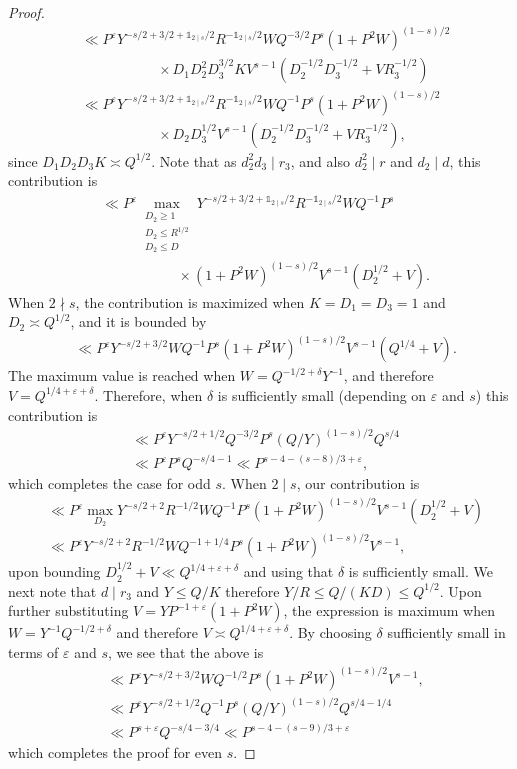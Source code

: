 \documentclass[letterpaper,11pt]{amsart}
\numberwithin{equation}{section}
\theoremstyle{definition}
\numberwithin{equation}{section}
\newcommand{\ve}{\varepsilon}
\begin{document}
\begin{proof}
\begin{align*}
&\ll P^{\ve}Y^{-s/2+3/2+\mathds{1}_{2\mid s}/2}R^{-\mathds{1}_{2\mid s}/2}WQ^{-3/2}P^{s}(1+P^2W)^{(1-s)/2}\\ & \quad \quad \quad \quad \quad \ \ \times D_1D_2^{2}D_3^{3/2}KV^{s-1}(D_2^{-1/2}D_3^{-1/2}+VR_3^{-1/2})\\
&\ll P^{\ve} Y^{-s/2+3/2+\mathds{1}_{2\mid s}/2}R^{-\mathds{1}_{2\mid s}/2}WQ^{-1}P^{s}(1+P^2W)^{(1-s)/2}\\ & \quad \quad \quad \quad \quad \ \ \times D_2D_3^{1/2}V^{s-1}(D_2^{-1/2}D_3^{-1/2}+VR_3^{-1/2}),
\end{align*}
since $D_1D_2D_3K\asymp Q^{1/2}$.
Note that as $d_2^2d_3\mid r_3$, and also $d_2^2\mid r$ and $d_2\mid d$, this contribution is
\begin{align*}
&\ll P^{\ve} \max_{ \substack{D_2 \geq 1\\ D_2\leq R^{1/2}\\D_2 \leq D}}Y^{-s/2+3/2+\mathds{1}_{2\mid s}/2}R^{-\mathds{1}_{2\mid s}/2}WQ^{-1}P^{s}\\ & \quad \quad \quad \quad \quad \ \ \times (1+P^2W)^{(1-s)/2}V^{s-1}(D_2^{1/2}+V).
\end{align*}
When $2\nmid s$, the contribution is maximized when $K=D_1=D_3=1$ and $D_2\asymp Q^{1/2}$, and it is bounded by
\begin{align*}
&\ll P^{\ve}Y^{-s/2+3/2}WQ^{-1}P^{s}(1+P^2W)^{(1-s)/2}V^{s-1}(Q^{1/4}+V).
\end{align*}
The maximum value is reached when $W=Q^{-1/2+\delta}Y^{-1} $, and therefore $V=Q^{1/4+\ve+\delta}$. Therefore, when $\delta$ is sufficiently small (depending on $\ve$ and $s$) this contribution is
\begin{align*}
&\ll P^{\ve}Y^{-s/2+1/2}Q^{-3/2}P^{s}(Q/Y)^{(1-s)/2}Q^{s/4}
\\&\ll P^{\ve}P^{s}Q^{-s/4-1}\ll P^{s-4-(s-8)/3+\ve},
\end{align*}
which completes the case for odd $s$. When $2\mid s $, our contribution is
\begin{align*}
    &\ll P^{\ve} \max_{ D_2}Y^{-s/2+2}R^{-1/2}WQ^{-1}P^{s}(1+P^2W)^{(1-s)/2}V^{s-1}(D_2^{1/2}+V)\\
    &\ll P^{\ve} Y^{-s/2+2}R^{-1/2}WQ^{-1+1/4}P^{s}(1+P^2W)^{(1-s)/2}V^{s-1},
\end{align*}
upon bounding $D_2^{1/2}+V\ll Q^{1/4+\ve+\delta}$ and using that $\delta$ is sufficiently small. We next note that $d\mid r_3$ and $Y\leq Q/K$ therefore $Y/R\leq Q/(KD)\leq Q^{1/2}$.  Upon further substituting $V=YP^{-1+\ve}(1+P^2W)$, the expression is maximum when $W=Y^{-1}Q^{-1/2+\delta}$ and therefore $V\asymp Q^{1/4+\ve+\delta}$.
By choosing $\delta$ sufficiently small in terms of $\ve$ and $s$, we see that the above is 
\begin{align*}
    &\ll P^{\ve} Y^{-s/2+3/2}WQ^{-1/2}P^{s}(1+P^2W)^{(1-s)/2}V^{s-1},\\
    &\ll P^{\ve} Y^{-s/2+1/2}Q^{-1}P^{s}(Q/Y)^{(1-s)/2}Q^{s/4-1/4}
    \\&\ll P^{s+\ve}Q^{-s/4-3/4}\ll P^{s-4-(s-9)/3+\ve}
\end{align*}
which completes the proof for even $s$.
\end{proof}
\end{document}
